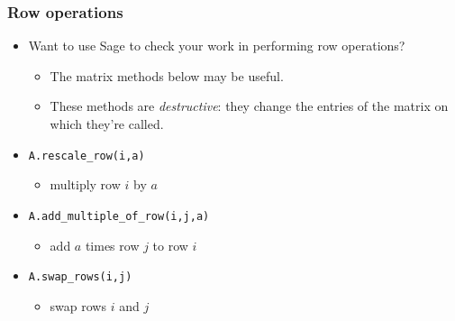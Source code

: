 \documentclass[11pt,ignorenonframetext,]{beamer}
\begin{document}
\begin{frame}\frametitle{Row operations}

\begin{itemize}
\itemsep1pt\parskip0pt
\item
  Want to use Sage to check your work in performing row operations?

  \begin{itemize}
  \itemsep1pt\parskip0pt
  \item
    The matrix methods below may be useful.
  \item
    These methods are \emph{destructive}: they change the entries of the
    matrix on which they're called.
  \end{itemize}
\item
  \texttt{A.rescale_row(i,a)}

  \begin{itemize}
  \itemsep1pt\parskip0pt
  \item
    multiply row $i$ by $a$
  \end{itemize}
\item
  \texttt{A.add_multiple_of_row(i,j,a)}

  \begin{itemize}
  \itemsep1pt\parskip0pt
  \item
    add $a$ times row $j$ to row $i$
  \end{itemize}
\item
  \texttt{A.swap_rows(i,j)}

  \begin{itemize}
  \itemsep1pt\parskip0pt
  \item
    swap rows $i$ and $j$
  \end{itemize}
\end{itemize}

\end{frame}
\end{document}
